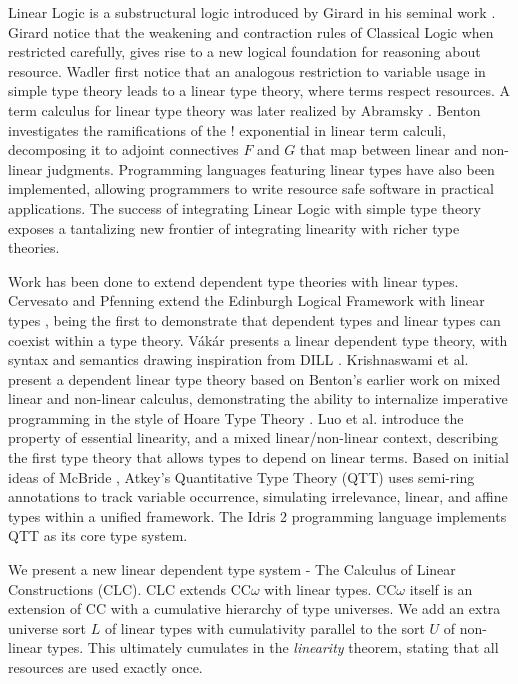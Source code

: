 \documentclass[sigplan,screen,review,authordraft]{acmart}
\theoremstyle{definition}
\begin{document}
  Linear Logic is a substructural logic introduced by Girard in his seminal work \cite{girard}. Girard notice that the weakening and contraction rules of Classical Logic when restricted carefully, gives rise to a new logical foundation for reasoning about resource. Wadler \cite{wadler1990,wadler1991} first notice that an analogous restriction to variable usage in simple type theory leads to a linear type theory, where terms respect resources. A term calculus for linear type theory was later realized by Abramsky \cite{abramsky1993}. Benton \cite{benton1994} investigates the ramifications of the ! exponential in linear term calculi, decomposing it to adjoint connectives $F$ and $G$ that map between linear and non-linear judgments. Programming languages \cite{l3,ats,linear-haskell} featuring linear types have also been implemented, allowing programmers to write resource safe software in practical applications. The success of integrating Linear Logic with simple type theory exposes a tantalizing new frontier of integrating linearity with richer type theories.

  Work has been done to extend dependent type theories with linear types. Cervesato and Pfenning extend the Edinburgh Logical Framework with linear types \cite{lf,llf}, being the first to demonstrate that dependent types and linear types can coexist within a type theory. V\'{a}k\'{a}r \cite{vakar14} presents a linear dependent type theory, with syntax and semantics drawing inspiration from DILL \cite{dill}.  Krishnaswami et al. present a dependent linear type theory \cite{neel15} based on Benton's earlier work on mixed linear and non-linear calculus, demonstrating the ability to internalize imperative programming in the style of Hoare Type Theory \cite{htt}. Luo et al. introduce the property of essential linearity, and a mixed linear/non-linear context, describing the first type theory that allows types to depend on linear terms. Based on initial ideas of McBride \cite{nothing}, Atkey's Quantitative Type Theory (QTT) \cite{qtt} uses semi-ring annotations to track variable occurrence, simulating irrelevance, linear, and affine types within a unified framework. The Idris 2 programming language \cite{idris2} implements QTT as its core type system.

  We present a new linear dependent type system - The Calculus of Linear Constructions (CLC). CLC extends CC$\omega$ with linear types. CC$\omega$ itself is an extension of CC with a cumulative hierarchy of type universes. We add an extra universe sort $L$ of linear types with cumulativity parallel to the sort $U$ of non-linear types. This ultimately cumulates in the \textit{linearity} theorem, stating that all resources are used exactly once.
\end{document}
